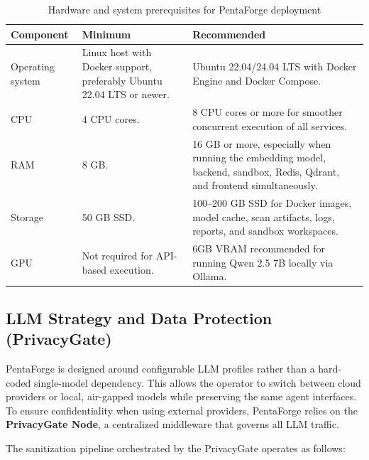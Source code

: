 \documentclass[12pt,a4paper]{report}
\begin{document}
\begin{table}[H]
    \centering
    \renewcommand{\arraystretch}{1.35}
    \begin{tabular}{|p{}|p{}|p{}|}
        \hline
        \textbf{Component} & \textbf{Minimum} & \textbf{Recommended} \\
        \hline
        Operating system & Linux host with Docker support, preferably Ubuntu 22.04
        LTS or newer. & Ubuntu 22.04/24.04 LTS with Docker Engine and Docker
        Compose. \\
        \hline
        CPU & 4 CPU cores. & 8 CPU cores or more for smoother concurrent execution
        of all services. \\
        \hline
        RAM & 8 GB. & 16 GB or more, especially when running the embedding model,
        backend, sandbox, Redis, Qdrant, and frontend simultaneously. \\
        \hline
        Storage & 50 GB SSD. & 100--200 GB SSD for Docker images, model cache,
        scan artifacts, logs, reports, and sandbox workspaces. \\
        \hline
        GPU & Not required for API-based execution. & 6GB VRAM recommended for
        running Qwen 2.5 7B locally via Ollama. \\
        
        \hline
    \end{tabular}
    \caption{Hardware and system prerequisites for PentaForge deployment}
    \label{tab:hardware_prerequisites}
\end{table}

\subsection{LLM Strategy and Data Protection (PrivacyGate)}

PentaForge is designed around configurable LLM profiles rather than a hard-coded
single-model dependency. This allows the operator to switch between cloud providers
or local, air-gapped models while preserving the same agent interfaces. To ensure
confidentiality when using external providers, PentaForge relies on the
\textbf{PrivacyGate Node}, a centralized middleware that governs all LLM traffic.

The sanitization pipeline orchestrated by the PrivacyGate operates as follows:
\end{document}
